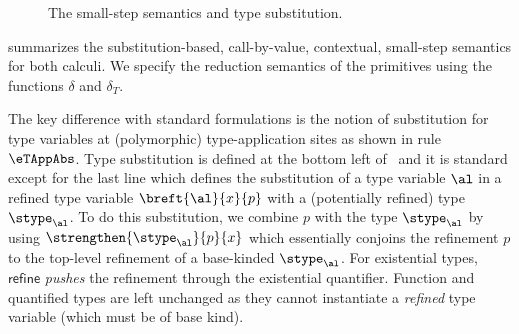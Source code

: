 \begin{figure}
\vspace{-0.2cm}
\caption{The small-step semantics and type substitution.} 
\label{fig:type-subst}
\label{fig:e}
\label{fig:opsem}
\vspace{-0.4cm}
\end{figure}

 summarizes the substitution-based, 
call-by-value, contextual, small-step semantics 
for both calculi.
%
We specify the reduction semantics 
of the primitives using the functions 
$\delta$ and $\delta_T$.

%
The key difference with standard formulations
is the notion of substitution for type variables 
at (polymorphic) type-application sites as shown 
in rule $\eTAppAbs$.
%
Type 
substitution is defined at the bottom left of~
and it is standard except 
for the last line which defines the substitution 
of a type variable $\al$ in a refined type variable 
${\breft{\al}{x}{p}}$ with a 
(potentially refined)
type $\stype_\al$.
%
To do this substitution, we combine $p$ with the type $\stype_\al$ 
by using $\strengthen{\stype_\al}{p}{x}$ 
which essentially conjoins the refinement $p$ 
to the top-level refinement of a base-kinded 
$\stype_\al$. 
%
For existential types, $\mathsf{refine}$ 
\emph{pushes} the refinement through the 
existential quantifier. 
%
Function and quantified types are left unchanged 
as they cannot instantiate a \emph{refined} 
type variable (which must be of base kind).


